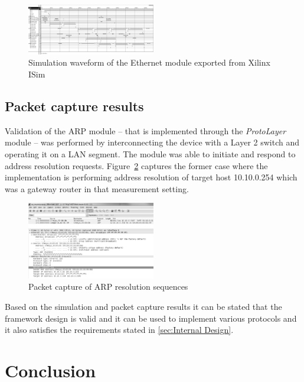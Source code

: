 \documentclass[conference]{IEEEtran}
\begin{document}
\begin{figure}[!htb]
    \centering
    \includegraphics[width=0.5\textwidth]{figures_raw/ether_tst_wave.png}
    \caption{Simulation waveform of the Ethernet module exported from Xilinx ISim}
    \label{fig:eth_sim}
\end{figure}

\subsection{Packet capture results}

Validation of the ARP module -- that is implemented through the \emph{ProtoLayer} module -- was performed by interconnecting the device with a Layer 2 switch and operating it on a LAN segment. The module was able to initiate and respond to address resolution requests. Figure~\ref{fig:pcap_arp_seq} captures the former case where the implementation is performing address resolution of target host 10.10.0.254 which was a gateway router in that measurement setting.

\begin{figure}[!htb]
    \centering
    \includegraphics[width=0.5\textwidth]{figures_raw/arp_transaction.png}
    \caption{Packet capture of ARP resolution sequences}
    \label{fig:pcap_arp_seq}
\end{figure}

Based on the simulation and packet capture results it can be stated that the framework design is valid and it can be used to implement various protocols and it also satisfies the requirements stated in \ref{sec:Internal Design}.

\section{Conclusion}
\end{document}
